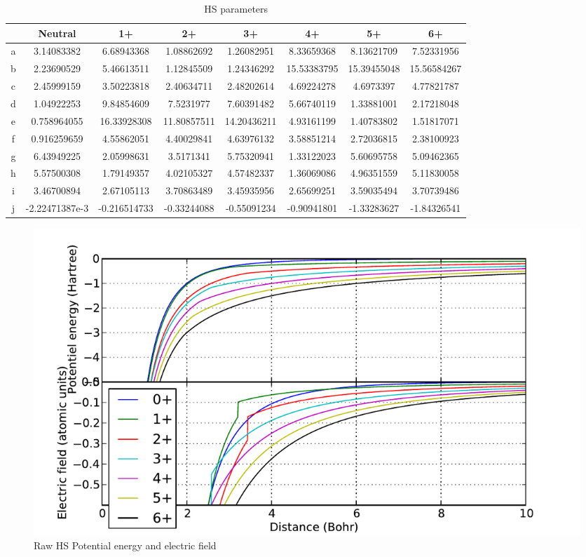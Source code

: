 \documentclass[12pt,letterpaper]{article}
\begin{document}
\begin{table}
\hspace{-45pt}
\begin{tabular}{|c|c|c|c|c|c|c|c|} \hline
  & Neutral         & 1+            & 2+            & 3+            & 4+            & 5+            & 6+            \\ \hline \hline
a & 3.14083382      & 6.68943368    & 1.08862692    & 1.26082951    & 8.33659368    & 8.13621709    & 7.52331956    \\ \hline
b & 2.23690529      & 5.46613511    & 1.12845509    & 1.24346292    & 15.53383795   & 15.39455048   & 15.56584267   \\ \hline
c & 2.45999159      & 3.50223818    & 2.40634711    & 2.48202614    & 4.69224278    & 4.6973397     & 4.77821787    \\ \hline
d & 1.04922253      & 9.84854609    & 7.5231977     & 7.60391482    & 5.66740119    & 1.33881001    & 2.17218048    \\ \hline
e & 0.758964055     & 16.33928308   & 11.80857511   & 14.20436211   & 4.93161199    & 1.40783802    & 1.51817071    \\ \hline
f & 0.916259659     & 4.55862051    & 4.40029841    & 4.63976132    & 3.58851214    & 2.72036815    & 2.38100923    \\ \hline
g & 6.43949225      & 2.05998631    & 3.5171341     & 5.75320941    & 1.33122023    & 5.60695758    & 5.09462365    \\ \hline
h & 5.57500308      & 1.79149357    & 4.02105327    & 4.57482337    & 1.36069086    & 4.96351559    & 5.11830058    \\ \hline
i & 3.46700894      & 2.67105113    & 3.70863489    & 3.45935956    & 2.65699251    & 3.59035494    & 3.70739486    \\ \hline
j & -2.22471387e-3  & -0.216514733  & -0.33244088   & -0.55091234   & -0.90941801   & -1.33283627   & -1.84326541   \\ \hline
\end{tabular}
\caption{\label{table:params}HS parameters}
\end{table}

\begin{figure}
\includegraphics[width=0.98\columnwidth]{hs_1_raw_fitted}
\caption{\label{fig:hs:raw_fitted}Raw HS Potential energy and electric field}
\end{figure}
\end{document}
